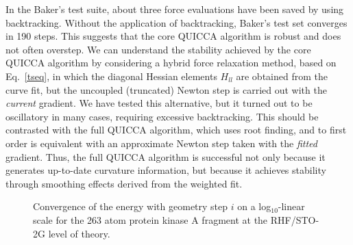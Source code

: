 \documentclass[prl,twocolumn,showpacs,twocolumngrid,superbib]{revtex4}
\begin{document}
In the Baker's test suite, about three force evaluations have been saved by 
using backtracking. Without the application of backtracking, Baker's test set
converges in 190 steps. 
This suggests that the core QUICCA algorithm is robust and
does not often overstep.  We can understand the stability achieved by the core QUICCA
algorithm by considering a hybrid force relaxation method, based on Eq.~\ref{tseq},
in which the diagonal Hessian elements $H_{ll}$ are obtained from the 
curve fit, but the uncoupled (truncated) Newton step is carried out with the {\em current} 
gradient.  We have tested this alternative, but it turned out to be oscillatory 
in many cases, requiring excessive backtracking.  This should be contrasted with the
full QUICCA algorithm, which uses root finding, and to first order is equivalent with 
an approximate Newton step taken with the {\em fitted} gradient.   Thus, the full 
QUICCA algorithm is successful not only because it generates up-to-date curvature information, 
but because it achieves stability through smoothing effects derived from the weighted fit.


\begin{figure}[h]
\caption{
Convergence of the energy with geometry step $i$ on a log$_{10}$-linear  scale for the 
263 atom protein kinase A fragment at the RHF/STO-2G level of theory.}\label{logn-logde} 
\end{figure}
\end{document}
